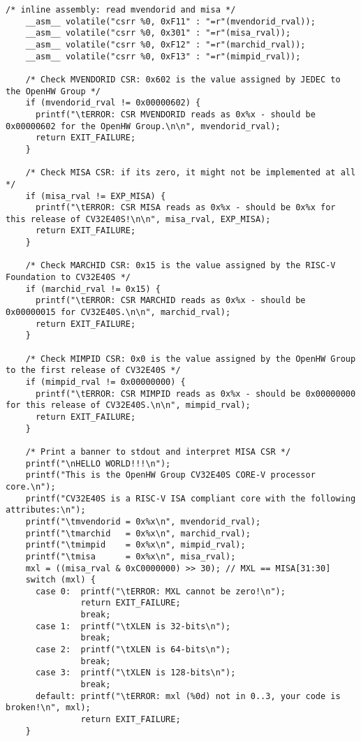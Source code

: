 \begin{lstlisting}[caption={Sanity test for the cores.}, label=lst:sample_code]
    /* inline assembly: read mvendorid and misa */
    __asm__ volatile("csrr %0, 0xF11" : "=r"(mvendorid_rval));
    __asm__ volatile("csrr %0, 0x301" : "=r"(misa_rval));
    __asm__ volatile("csrr %0, 0xF12" : "=r"(marchid_rval));
    __asm__ volatile("csrr %0, 0xF13" : "=r"(mimpid_rval));

    /* Check MVENDORID CSR: 0x602 is the value assigned by JEDEC to the OpenHW Group */
    if (mvendorid_rval != 0x00000602) {
      printf("\tERROR: CSR MVENDORID reads as 0x%x - should be 0x00000602 for the OpenHW Group.\n\n", mvendorid_rval);
      return EXIT_FAILURE;
    }

    /* Check MISA CSR: if its zero, it might not be implemented at all */
    if (misa_rval != EXP_MISA) {
      printf("\tERROR: CSR MISA reads as 0x%x - should be 0x%x for this release of CV32E40S!\n\n", misa_rval, EXP_MISA);
      return EXIT_FAILURE;
    }

    /* Check MARCHID CSR: 0x15 is the value assigned by the RISC-V Foundation to CV32E40S */
    if (marchid_rval != 0x15) {
      printf("\tERROR: CSR MARCHID reads as 0x%x - should be 0x00000015 for CV32E40S.\n\n", marchid_rval);
      return EXIT_FAILURE;
    }

    /* Check MIMPID CSR: 0x0 is the value assigned by the OpenHW Group to the first release of CV32E40S */
    if (mimpid_rval != 0x00000000) {
      printf("\tERROR: CSR MIMPID reads as 0x%x - should be 0x00000000 for this release of CV32E40S.\n\n", mimpid_rval);
      return EXIT_FAILURE;
    }

    /* Print a banner to stdout and interpret MISA CSR */
    printf("\nHELLO WORLD!!!\n");
    printf("This is the OpenHW Group CV32E40S CORE-V processor core.\n");
    printf("CV32E40S is a RISC-V ISA compliant core with the following attributes:\n");
    printf("\tmvendorid = 0x%x\n", mvendorid_rval);
    printf("\tmarchid   = 0x%x\n", marchid_rval);
    printf("\tmimpid    = 0x%x\n", mimpid_rval);
    printf("\tmisa      = 0x%x\n", misa_rval);
    mxl = ((misa_rval & 0xC0000000) >> 30); // MXL == MISA[31:30]
    switch (mxl) {
      case 0:  printf("\tERROR: MXL cannot be zero!\n");
               return EXIT_FAILURE;
               break;
      case 1:  printf("\tXLEN is 32-bits\n");
               break;
      case 2:  printf("\tXLEN is 64-bits\n");
               break;
      case 3:  printf("\tXLEN is 128-bits\n");
               break;
      default: printf("\tERROR: mxl (%0d) not in 0..3, your code is broken!\n", mxl);
               return EXIT_FAILURE;
    }


\end{lstlisting}
